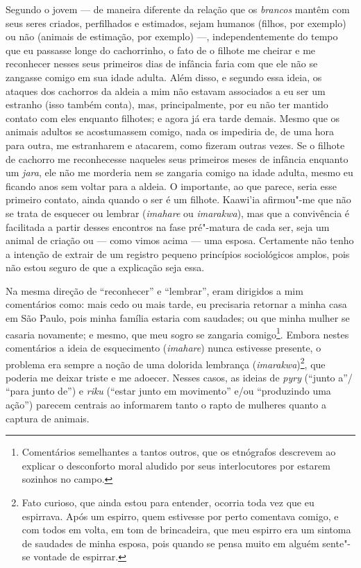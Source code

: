 Segundo o jovem --- de maneira diferente da relação que os \emph{brancos}
mantêm com seus seres criados, perfilhados e estimados, sejam humanos
(filhos, por exemplo) ou não (animais de estimação, por exemplo) ---,
independentemente do tempo que eu passasse longe do cachorrinho, o fato
de o filhote me cheirar e me reconhecer nesses seus primeiros dias de
infância faria com que ele não se zangasse comigo em sua idade adulta.
Além disso, e segundo essa ideia, os ataques dos cachorros da aldeia a
mim não estavam associados a eu ser um estranho (isso também conta),
mas, principalmente, por eu não ter mantido contato com eles enquanto
filhotes; e agora já era tarde demais. Mesmo que os animais adultos se
acostumassem comigo, nada os impediria de, de uma hora para outra, me
estranharem e atacarem, como fizeram outras vezes. Se o filhote de
cachorro me reconhecesse naqueles seus primeiros meses de infância
enquanto um \emph{jara}, ele não me morderia nem se zangaria comigo na
idade adulta, mesmo eu ficando anos sem voltar para a aldeia. O
importante, ao que parece, seria esse primeiro contato, ainda quando o
ser é um filhote. Kaawi'ia afirmou"-me que não se trata de esquecer ou
lembrar (\emph{imahare} ou \emph{imarakwa}), mas que a convivência é
facilitada a partir desses encontros na fase pré"-matura de cada ser,
seja um animal de criação ou --- como vimos acima --- uma esposa. Certamente
não tenho a intenção de extrair de um registro pequeno princípios
sociológicos amplos, pois não estou seguro de que a explicação seja
essa.

Na mesma direção de ``reconhecer'' e ``lembrar'', eram dirigidos a mim
comentários como: mais cedo ou mais tarde, eu precisaria retornar a
minha casa em São Paulo, pois minha família estaria com saudades; ou que
minha mulher se casaria novamente; e mesmo, que meu sogro se zangaria
comigo\footnote{Comentários semelhantes a tantos outros, que os
  etnógrafos descrevem ao explicar o desconforto moral aludido por seus
  interlocutores por estarem sozinhos no campo.}. Embora nestes
comentários a ideia de esquecimento (\emph{imahare}) nunca estivesse
presente, o problema era sempre a noção de uma dolorida lembrança
(\emph{imarakwa})\footnote{Fato curioso, que ainda estou para entender,
  ocorria toda vez que eu espirrava. Após um espirro, quem estivesse por
  perto comentava comigo, e com todos em volta, em tom de brincadeira,
  que meu espirro era um sintoma de saudades de minha esposa, pois
  quando se pensa muito em alguém sente"-se vontade de espirrar.}, que
poderia me deixar triste e me adoecer. Nesses casos, as ideias de
\emph{pyry} (``junto a''/ ``para junto de'') e \emph{riku} (``estar junto em
movimento'' e/ou ``produzindo uma ação'') parecem centrais ao informarem
tanto o rapto de mulheres quanto a captura de animais.

